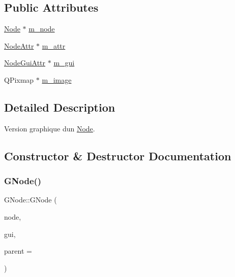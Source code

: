 \subsection*{Public Attributes}
\begin{DoxyCompactItemize}
\item 
\mbox{\hyperlink{class_node}{Node}} $\ast$ \mbox{\hyperlink{struct_g_node_a1f5acd0ae89f506fdbd8674b0cda648c}{m\+\_\+node}}
\item 
\mbox{\hyperlink{struct_node_attr}{Node\+Attr}} $\ast$ \mbox{\hyperlink{struct_g_node_a9af79b0be58beeca8e76eef4d1798555}{m\+\_\+attr}}
\item 
\mbox{\hyperlink{struct_node_gui_attr}{Node\+Gui\+Attr}} $\ast$ \mbox{\hyperlink{struct_g_node_a3883c1648b5f4b39872eac62d0d9f74d}{m\+\_\+gui}}
\item 
Q\+Pixmap $\ast$ \mbox{\hyperlink{struct_g_node_a77e0c9572f6f27150ed75b3a55120d08}{m\+\_\+image}}
\end{DoxyCompactItemize}


\subsection{Detailed Description}
Version graphique d\textquotesingle{}un \mbox{\hyperlink{class_node}{Node}}. 

\subsection{Constructor \& Destructor Documentation}
\mbox{\label{struct_g_node_a2344be00333e7e3c1e481320dab0ab6c}} 
\subsubsection{\texorpdfstring{G\+Node()}{GNode()}}
{\footnotesize\ttfamily G\+Node\+::\+G\+Node (\begin{DoxyParamCaption}\item[{\mbox{\hyperlink{class_node}{Node}} $\ast$}]{node,  }\item[{\mbox{\hyperlink{struct_node_gui_attr}{Node\+Gui\+Attr}} $\ast$}]{gui,  }\item[{Q\+Widget $\ast$}]{parent = {} }\end{DoxyParamCaption})\hspace{0.3cm}{\ttfamily [inline]}}

